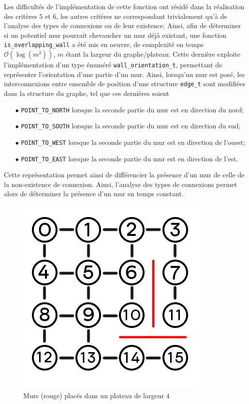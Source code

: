 \documentclass[11pt]{article}
\begin{document}
Les difficultés de l'implémentation de cette fonction ont résidé dans la réalisation des critères $5$ et $6$, les autres critères ne correspondant trivialement qu'à de l'analyse des types de connexions ou de leur existence. Ainsi, afin de déterminer si un potentiel mur pourrait chevaucher un mur déjà existant, une fonction \texttt{is\_overlapping\_wall} a été mis en oeuvre, de complexité en temps $\mathcal{O}(\log(m^{2}))$, $m$ étant la largeur du graphe/plateau. Cette dernière exploite l'implémentation d'un type énuméré \texttt{wall\_orientation\_t}, permettant de représenter l'orientation d'une partie d'un mur. Ainsi, lorsqu'un mur est posé, les interconnexions entre ensemble de position d'une structure \texttt{edge\_t} sont modifiées dans la structure du graphe, tel que ces dernières soient
\begin{itemize}
    \item [$\bullet$] \texttt{POINT\_TO\_NORTH} lorsque la seconde partie du mur est en direction du nord;
    \item [$\bullet$] \texttt{POINT\_TO\_SOUTH} lorsque la seconde partie du mur est en direction du sud;
    \item [$\bullet$] \texttt{POINT\_TO\_WEST} lorsque la seconde partie du mur est en direction de l'ouest;
    \item [$\bullet$] \texttt{POINT\_TO\_EAST} lorsque la seconde partie du mur est en direction de l'est.
\end{itemize}
Cette représentation permet ainsi de différencier la présence d'un mur de celle de la non-existence de connexion. Ainsi, l'analyse des types de connexions permet alors de déterminer la présence d'un mur en temps constant.

\begin{figure}[H]
    \centering
    \includegraphics[scale = 0.5]{wall_direction.png}
    \caption{Murs (rouge) placés dans un plateau de largeur $4$}
    \label{fig:wall_direction}
\end{figure}
\end{document}
